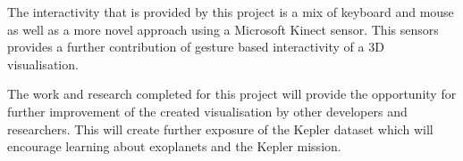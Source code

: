 The interactivity that is provided by this project is a mix of keyboard and
mouse as well as a more novel approach using a Microsoft Kinect sensor. This
sensors provides a further contribution of gesture based interactivity of a 3D
visualisation.

The work and research completed for this project will provide the opportunity
for further improvement of the created visualisation by other developers and
researchers. This will create further exposure of the Kepler dataset which will
encourage learning about exoplanets and the Kepler mission.
